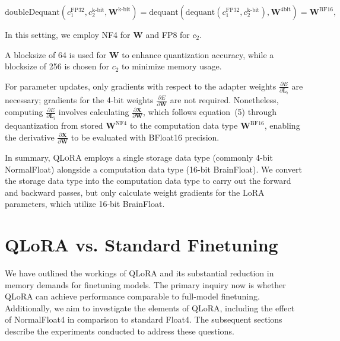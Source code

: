 \begin{equation}
    \text{doubleDequant}(c_1^{\text{FP32}}, c_2^{\text{k-bit}}, \mathbf{W}^{\text{k-bit}}) = \text{dequant}(\text{dequant}(c_1^{\text{FP32}}, c_2^{\text{k-bit}}), \mathbf{W}^{\text{4bit}}) = \mathbf{W}^{\text{BF16}},
\end{equation}

In this setting, we employ NF4 for $\mathbf{W}$ and FP8 for $c_2$.

A blocksize of 64 is used for $\mathbf{W}$ to enhance quantization accuracy, while a blocksize of 256 is chosen for $c_2$ to minimize memory usage.

For parameter updates, only gradients with respect to the adapter weights $\frac{\partial E}{\partial \mathbf{L}_i}$ are necessary; gradients for the 4-bit weights $\frac{\partial E}{\partial \mathbf{W}}$ are not required. Nonetheless, computing $\frac{\partial E}{\partial \mathbf{L}_i}$ involves calculating $\frac{\partial \mathbf{X}}{\partial \mathbf{W}}$, which follows equation~(5) through dequantization from stored $\mathbf{W}^{\text{NF4}}$ to the computation data type $\mathbf{W}^{\text{BF16}}$, enabling the derivative $\frac{\partial \mathbf{X}}{\partial \mathbf{W}}$ to be evaluated with BFloat16 precision.

In summary, \textsc{QLoRA} employs a single storage data type (commonly 4-bit NormalFloat) alongside a computation data type (16-bit BrainFloat). We convert the storage data type into the computation data type to carry out the forward and backward passes, but only calculate weight gradients for the LoRA parameters, which utilize 16-bit BrainFloat.

\section{QLoRA vs. Standard Finetuning}
\label{sec:comp_to_std}

We have outlined the workings of QLoRA and its substantial reduction in memory demands for finetuning models. The primary inquiry now is whether QLoRA can achieve performance comparable to full-model finetuning. Additionally, we aim to investigate the elements of QLoRA, including the effect of NormalFloat4 in comparison to standard Float4. The subsequent sections describe the experiments conducted to address these questions.

